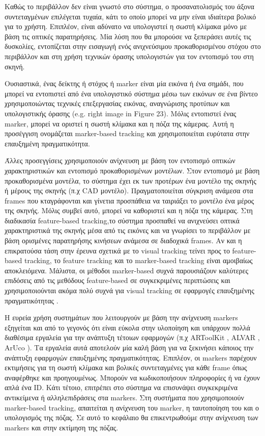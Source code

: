 Καθώς το περιβάλλον δεν είναι γνωστό στο σύστημα, ο προσανατολισμός του άξονα συντεταγμένων επιλέγεται τυχαία, κάτι το οποίο μπορεί να μην είναι ιδιαίτερα βολικό για το χρήστη. Επιπλέον, είναι αδύνατο να υπολογιστεί η σωστή κλίμακα μόνο με βάση τις οπτικές παρατηρήσεις. Μία λύση που θα μπορούσε να ξεπεράσει αυτές τις δυσκολίες, εντοπίζεται στην εισαγωγή ενός ανιχνεύσιμου προκαθορισμένου στόχου στο περιβάλλον και στη χρήση τεχνικών όρασης υπολογιστών για τον εντοπισμό του στη σκηνή. 

Ουσιαστικά, ένας δείκτης ή στόχος ή marker είναι μία εικόνα ή ένα σημάδι, που μπορεί να εντοπιστεί από ένα υπολογιστικό σύστημα μέσω των εικόνων σε ένα βίντεο χρησιμοποιώντας τεχνικές επεξεργασίας εικόνας, αναγνώρισης προτύπων και υπολογιστικής όρασης (e.g. right image in Figure 23). Μόλις εντοπιστεί ένας marker, μπορεί να οριστεί η σωστή κλίμακα και η πόζα της κάμερας. Αυτή η προσέγγιση ονομάζεται marker-based tracking και χρησιμοποιείται ευρύτατα στην επαυξημένη πραγματικότητα.

Άλλες προσεγγίσεις χρησιμοποιούν ανίχνευση με βάση τον εντοπισμό οπτικών χαρακτηριστικών και εντοπισμό προκαθορισμένων μοντέλων. Στον εντοπισμό με βάση προκαθορισμένα μοντέλα, το σύστημα έχει εκ των προτέρων ένα μοντέλο της σκηνής ή μέρους της σκηνής (π.χ CAD μοντέλο). Πραγματοποιείται σύγκριση ανάμεσα στα frames που κταγράφονται και γίνετια προσπάθεια να ταιριάξει το μοντέλο ένα μέρος της σκηνής. Μόλις συμβεί αυτό, μπορεί να καθοριστεί και η πόζα της κάμερας. Στη διαδικασία feature-based tracking,το σύστημα προσπαθεί να ανιχνεύσει οπτικά χαρακτηριστικά της σκηνής μέσα από τις εικόνες και να γνωρίσει το περιβάλλον με βάση ορισμένες παρατηρήσης κινήσεων ανάμεσα σε διαδοχικά frames. Αν και η επικρατούσα τάση στην έρευνα σχετικά με το visual tracking τείνει προς το feature-based tracking, το feature tracking και το marker-based tracking είναι αμοιβαίως αποκλειόμενα. Μάλιστα, οι μέθοδοι marker-based συχνά παρουσιάζουν καλύτερες επιδόσεις από τις μεθόδους feature-based σε συγκεκριμένες περιπτώσεις και χρησιμοποιούνται ακόμα πολύ συχνά για visual tracking σε εφαρμογές επαυξημένης πραγματικότητας \cite{wagner2008robust} \cite{rabbi2014applications} .


Η ευρεία χρήση συστημάτων που λειτουργούν με βάση την ανίχνευση markers εξηγείται και από το γεγονός ότι είναι εύκολα στην υλοποίηση και υπάρχουν πολλά διαθέσιμα εργαλεία για την ανάπτυξη τέτοιων εφαρμογών (π.χ ARToolKit \cite{artoolkit}, ALVAR \cite{alvar}, ArUco \cite{aruco}). Τα εργαλεία αυτά αποτελούν μία καλή βάση για να ξεκινήσει κάποιος την ανάπτυξη εφαρμογών επαυξημένης πραγματικότητας. Επιπλέον, οι markers παρέχουν εκτιμήσεις για τη σωστή κλίμακα και βολικές συντεταγμένες για κάθε frame όπως αναφέρθηκε και προηγουμένως. Μπορούν να κωδικοποιήσουν πληροφορίες ή να έχουν απλά ένα ID. Κάτι τέτοιο, επιτρέπει στο σύστημα να επισυνάψει συγκεκριμένα αντικείμενα ή αλληλεπιδράσεις στα markers. Στη συστήματα που χρησιμοποιούν marker-based tracking, απαιτείται η ανίχνευση του marker, η ταυτοποίηση του και ο υπολογισμός της πόζας. Σε αυτό το κεφάλαιο θα επικεντρωθούμε στην ανίχνευση των markers και στην εκτίμηση της πόζας. 

